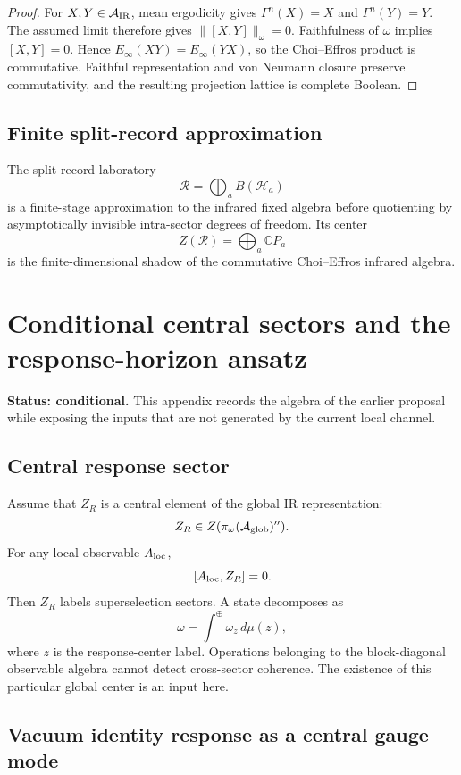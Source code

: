 \documentclass[11pt]{article}
\newcommand{\A}{\mathcal A}
\newcommand{\Hh}{\mathcal H}
\newcommand{\R}{\mathcal R}
\begin{document}
\begin{proof}
For \(X,Y\in\A_{\rm IR}\), mean ergodicity gives
\(\Gamma^n(X)=X\) and \(\Gamma^n(Y)=Y\).  The assumed limit therefore gives
\(\|[X,Y]\|_\omega=0\).  Faithfulness of \(\omega\) implies
\([X,Y]=0\).  Hence
\(E_\infty(XY)=E_\infty(YX)\), so the Choi--Effros product is commutative.
Faithful representation and von Neumann closure preserve commutativity, and
the resulting projection lattice is complete Boolean.
\end{proof}

\subsection*{Finite split-record approximation}

The split-record laboratory
\[
\R=\bigoplus_aB(\Hh_a)
\]
is a finite-stage approximation to the infrared fixed algebra before quotienting by asymptotically invisible intra-sector degrees of freedom.  Its center
\[
Z(\R)=\bigoplus_a\mathbb C P_a
\]
is the finite-dimensional shadow of the commutative Choi--Effros infrared algebra.

\section{Conditional central sectors and the response-horizon
ansatz}\label{app:v62-superselection-free-energy}

\textbf{Status: conditional.}
This appendix records the algebra of the earlier proposal while exposing the
inputs that are not generated by the current local channel.

\subsection*{Central response sector}

Assume that \(Z_R\) is a central element of the global IR representation:
\[
Z_R\in Z(\pi_\omega(\A_{\rm glob})'').
\]
For any local observable $A_{\rm loc}$,
\[
[A_{\rm loc},Z_R]=0.
\]
Then $Z_R$ labels superselection sectors.  A state decomposes as
\[
\omega=\int^\oplus \omega_z\,d\mu(z),
\]
where $z$ is the response-center label.  Operations belonging to the
block-diagonal observable algebra cannot detect cross-sector coherence.
The existence of this particular global center is an input here.

\subsection*{Vacuum identity response as a central gauge mode}
\end{document}
